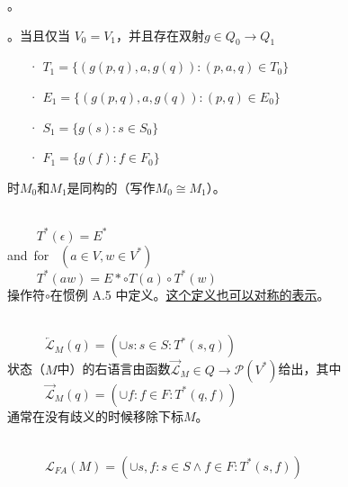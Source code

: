 {{。
\newline

。当且仅当 $V_0=V_1$，并且存在双射$g\in Q_0 \longrightarrow Q_1$ 

\begin{itemize}
    \item[·] $T_1 = \{ (g(p,q),a,g(q)) : (p,a,q) \in T_0 \}$
    \item[·] $E_1 = \{ (g(p,q),a,g(q)) : (p,q) \in E_0\}$
    \item[·] $S_1 = \{ g(s):s\in S_0 \}$
    \item[·] $F_1 = \{ g(f):f\in F_0 \}$
\end{itemize}
时$M_0$和$M_1$是同构的（写作$M_0 \cong M_1$）。
\newline

 \\
\mbox{　　} $T^*(\epsilon) = E^*$ \\
\mbox{and for } $(a\in V,w\in V^*)$ \\
\mbox{　　} $ T^*(aw) = E* \circ T(a) \circ T^*(w) $ \\
操作符$\circ$在惯例 A.5 中定义。\uline{这个定义也可以对称的表示}。
\newline

\newline

 \\
\mbox{　　}　$ \overleftarrow{\mathcal{L}}_M (q) = ( \cup s:s \in S : T^*(s,q) ) $ \\
状态（$M$中）的右语言由函数$ \overrightarrow{\mathcal{L}} _M \in Q \longrightarrow \mathcal{P}(V^*)$给出，其中 \\
\mbox{　　}　$ \overrightarrow{\mathcal{L}}_M (q) = ( \cup f:f \in F : T^*(q,f) ) $ \\
通常在没有歧义的时候移除下标$M$。
\newline

 \\
\mbox{　　}　$ \mathcal{L}_{FA} (M) = (\cup s,f:s \in S \land f \in F : T^* (s,f)) $ \\

}}
